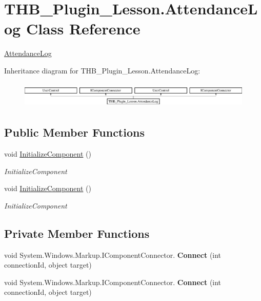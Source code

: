 \hypertarget{class_t_h_b___plugin___lesson_1_1_attendance_log}{}\section{T\+H\+B\+\_\+\+Plugin\+\_\+\+Lesson.\+Attendance\+Log Class Reference}
\label{class_t_h_b___plugin___lesson_1_1_attendance_log}


\mbox{\hyperlink{class_t_h_b___plugin___lesson_1_1_attendance_log}{Attendance\+Log}}  


Inheritance diagram for T\+H\+B\+\_\+\+Plugin\+\_\+\+Lesson.\+Attendance\+Log\+:\begin{figure}[H]
\begin{center}
\leavevmode
\includegraphics[height=1.261261cm]{de/d96/class_t_h_b___plugin___lesson_1_1_attendance_log}
\end{center}
\end{figure}
\subsection*{Public Member Functions}
\begin{DoxyCompactItemize}
\item 
void \mbox{\hyperlink{class_t_h_b___plugin___lesson_1_1_attendance_log_a0a404a85aae774982191011835216820}{Initialize\+Component}} ()
\begin{DoxyCompactList}\small\item\em Initialize\+Component \end{DoxyCompactList}\item 
void \mbox{\hyperlink{class_t_h_b___plugin___lesson_1_1_attendance_log_a0a404a85aae774982191011835216820}{Initialize\+Component}} ()
\begin{DoxyCompactList}\small\item\em Initialize\+Component \end{DoxyCompactList}\end{DoxyCompactItemize}
\subsection*{Private Member Functions}
\begin{DoxyCompactItemize}
\item 
\mbox{\label{class_t_h_b___plugin___lesson_1_1_attendance_log_a5b9cdcd533bb9522e504d294f3fe6526}} 
void System.\+Windows.\+Markup.\+I\+Component\+Connector. {\bfseries Connect} (int connection\+Id, object target)
\item 
\mbox{\label{class_t_h_b___plugin___lesson_1_1_attendance_log_a5b9cdcd533bb9522e504d294f3fe6526}} 
void System.\+Windows.\+Markup.\+I\+Component\+Connector. {\bfseries Connect} (int connection\+Id, object target)
\end{DoxyCompactItemize}
